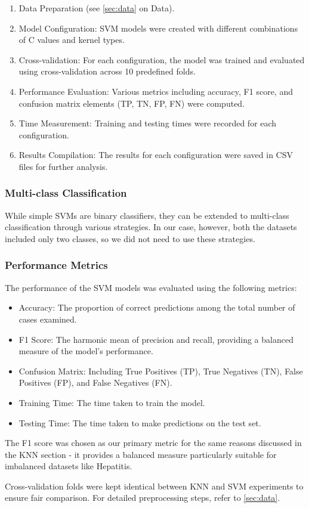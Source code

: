 \begin{enumerate}
    \item Data Preparation (see \autoref{sec:data} on Data).
    \item Model Configuration: SVM models were created with different combinations of C values and kernel types.
    \item Cross-validation: For each configuration, the model was trained and evaluated using cross-validation across 10 predefined folds.
    \item Performance Evaluation: Various metrics including accuracy, F1 score, and confusion matrix elements (TP, TN, FP, FN) were computed.
    \item Time Measurement: Training and testing times were recorded for each configuration.
    \item Results Compilation: The results for each configuration were saved in CSV files for further analysis.
\end{enumerate}

\subsubsection{Multi-class Classification}

While simple SVMs are binary classifiers, they can be extended to multi-class classification through various strategies.
In our case, however, both the datasets included only two classes, so we did not need to use these strategies.

\subsubsection{Performance Metrics}

The performance of the SVM models was evaluated using the following metrics:

\begin{itemize}
    \item Accuracy: The proportion of correct predictions among the total number of cases examined.
    \item F1 Score: The harmonic mean of precision and recall, providing a balanced measure of the model's performance.
    \item Confusion Matrix: Including True Positives (TP), True Negatives (TN), False Positives (FP), and False Negatives (FN).
    \item Training Time: The time taken to train the model.
    \item Testing Time: The time taken to make predictions on the test set.
\end{itemize}
The F1 score was chosen as our primary metric for the same reasons discussed in the KNN section - it provides a balanced measure particularly suitable for imbalanced datasets like Hepatitis.

Cross-validation folds were kept identical between KNN and SVM experiments to ensure fair comparison. For detailed preprocessing steps, refer to \autoref{sec:data}.

